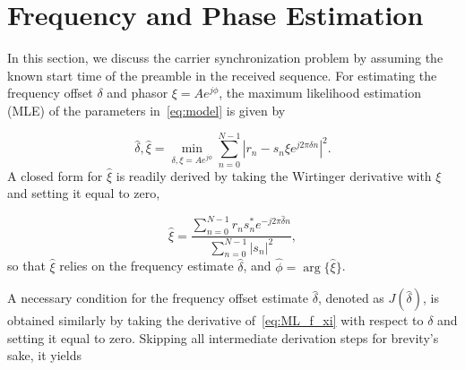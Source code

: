 \section{Frequency and Phase Estimation}%
\label{sec:freq_est}   

In this section, we discuss the carrier synchronization problem by assuming the known start time of the preamble in the received sequence.
For estimating the frequency offset $\delta$ and phasor $\xi=Ae^{j\phi}$, the maximum likelihood estimation (MLE) of the parameters in~\eqref{eq:model} is given by

\begin{equation}
    \label{eq:ML_f_xi}
      \hat{\delta},\hat{\xi}=\min_{\delta,\xi=Ae^{j\phi}}\sum_{n=0}^{N-1}|r_n-s_n\xi e^{j2\pi\delta n}|^{2}.
    \end{equation}
A closed form for $\hat{\xi}$ is readily derived by taking the Wirtinger derivative with $\xi$ and setting it equal to zero,

\begin{equation}
    \label{eq:opt_xi}
    \hat{\xi}=\frac{\sum_{n=0}^{N-1}{r_{n}s_n^{*}e^{-j2\pi\hat{\delta} n}}}{\sum_{n=0}^{N-1}|s_{n}|^2},
  \end{equation}
so that $\hat{\xi}$ relies on the frequency estimate $\hat{\delta}$, and $\hat{\phi}=\arg\{\hat{\xi}\}$. 


A necessary condition for the frequency offset estimate $\hat{\delta}$, denoted as $J(\hat{\delta})$,
is obtained similarly by taking the derivative of~\eqref{eq:ML_f_xi} with respect to
$\delta$ and setting it equal to zero. Skipping all intermediate derivation steps for brevity's sake,
it yields

